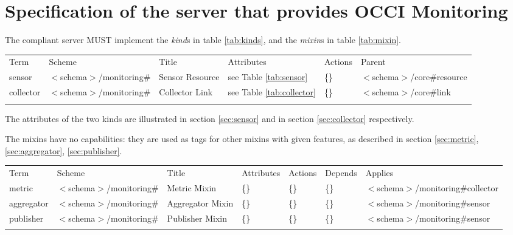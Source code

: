 \documentclass[10pt,a4paper]{article}
\begin{document}
\section{Specification of the server that provides OCCI Monitoring}

The compliant server MUST implement the {\em kind}s in table \ref{tab:kinds}, and the {\em mixin}s in table \ref{tab:mixin}.

 {
        \begin{tabular}{llllll}
        \toprule
        Term & Scheme & Title & Attributes & Actions & Parent\\
        \colrule
        sensor &  $<$schema$>$/monitoring\# & Sensor Resource
        & see Table \ref{tab:sensor} & \{\} &  $<$schema$>$/core\#resource\\
        collector &  $<$schema$>$/monitoring\# & Collector Link
        & see Table \ref{tab:collector} & \{\} & $<$schema$>$/core\#link \\
        \botrule
        \end{tabular}
}

The attributes of the two kinds are illustrated in section \ref{sec:sensor} and in section \ref{sec:collector} respectively.

The mixins have no capabilities: they are used as tags for other mixins with given features, as described in section \ref{sec:metric}, \ref{sec:aggregator}, \ref{sec:publisher}.


 {
        \begin{tabular}{lllllll}
        \toprule
        Term & Scheme & Title & Attributes & Actions & Depends & Applies \\
        \colrule
        metric &  $<$schema$>$/monitoring\# & Metric Mixin 
        & \{\} & \{\} & \{\} & $<$schema$>$/monitoring\#collector \\
        aggregator &  $<$schema$>$/monitoring\# & Aggregator Mixin 
        & \{\} & \{\} & \{\} & $<$schema$>$/monitoring\#sensor \\
        publisher &  $<$schema$>$/monitoring\# & Publisher Mixin 
        & \{\} & \{\} & \{\} & $<$schema$>$/monitoring\#sensor \\
        \botrule
        \end{tabular}
}
\end{document}
